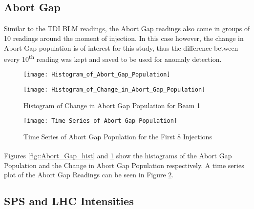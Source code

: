 \subsection{Abort Gap}
\paragraph{ }Similar to the \acs{TDI} \acs{BLM} readings, the Abort Gap readings also come in groups of 10 readings around the moment of injection. In this case however, the change in Abort Gap population is of interest for this study, thus the difference between every 10\textsuperscript{th} reading was kept and saved to be used for anomaly detection.

\begin{figure}[!t]
	\begin{minipage}[b]{0.475\linewidth}
		\centering
		\texttt{[image: Histogram\_of\_Abort\_Gap\_Population]}
		\caption[Abort Gap Histogram]{Histogram of Abort Gap Population for Beam 1}
		\label{fig::Abort_Gap_hist}
	\end{minipage}	
	\hspace{0.25cm}
	\begin{minipage}[b]{0.475\linewidth}
		\centering
		\texttt{[image: Histogram\_of\_Change\_in\_Abort\_Gap\_Population]}
		\caption[Change in Abort Gap Histogram]{Histogram of Change in Abort Gap Population for Beam 1}
		\label{fig::Change_in_Abort_Gap_hist}
	\end{minipage}	
\end{figure}

\begin{figure}[b]
	\centering
	\texttt{[image: Time\_Series\_of\_Abort\_Gap\_Population]}
	\caption[Abort Gap Time Series]{Time Series of Abort Gap  Population for the First 8 Injections}
	\label{fig::Abort_Gap_Time_Series}
\end{figure}  


\paragraph{ }Figures \ref{fig::Abort_Gap_hist} and \ref{fig::Change_in_Abort_Gap_hist} show the histograms of the Abort Gap Population and the Change in Abort Gap Population respectively. A time series plot of the Abort Gap Readings can be seen in Figure \ref{fig::Abort_Gap_Time_Series}.

\subsection{\acs{SPS} and \acs{LHC} Intensities}
